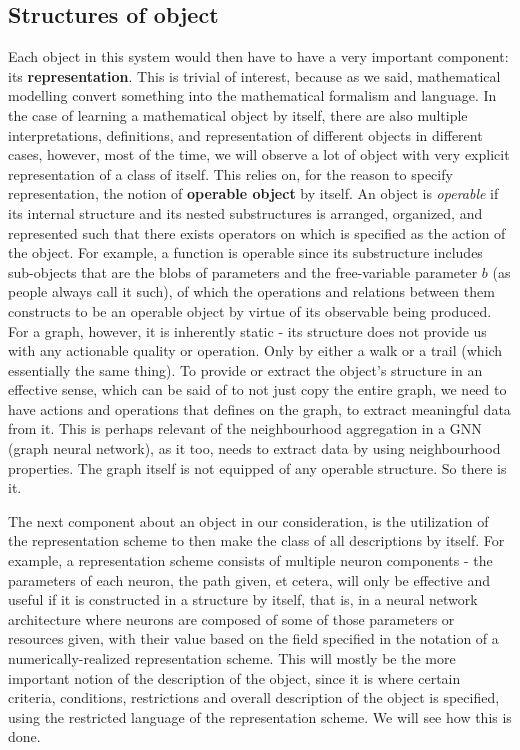 \documentclass{article}
\begin{document}
\subsection{Structures of object}


Each object in this system would then have to have a very important component: its \textbf{representation}. This is trivial of interest, because as we said, mathematical modelling convert something into the mathematical formalism and language. In the case of learning a mathematical object by itself, there are also multiple interpretations, definitions, and representation of different objects in different cases, however, most of the time, we will observe a lot of object with very explicit representation of a class of itself. This relies on, for the reason to specify representation, the notion of \textbf{operable object} by itself. An object is \textit{operable} if its internal structure and its nested substructures is arranged, organized, and represented such that there exists operators on which is specified as the action of the object. For example, a function is operable since its substructure includes sub-objects that are the blobs of parameters and the free-variable parameter $b$ (as people always call it such), of which the operations and relations between them constructs to be an operable object by virtue of its observable being produced. For a graph, however, it is inherently static - its structure does not provide us with any actionable quality or operation. Only by either a walk or a trail (which essentially the same thing). To provide or extract the object's structure in an effective sense, which can be said of to not just copy the entire graph, we need to have actions and operations that defines on the graph, to extract meaningful data from it. This is perhaps relevant of the neighbourhood aggregation in a GNN (graph neural network), as it too, needs to extract data by using neighbourhood properties. The graph itself is not equipped of any operable structure. So there is it. 

The next component about an object in our consideration, is the utilization of the representation scheme to then make the class of all descriptions by itself. For example, a representation scheme consists of multiple neuron components - the parameters of each neuron, the path given, et cetera, will only be effective and useful if it is constructed in a structure by itself, that is, in a neural network architecture where neurons are composed of some of those parameters or resources given, with their value based on the field specified in the notation of a numerically-realized representation scheme. This will mostly be the more important notion of the description of the object, since it is where certain criteria, conditions, restrictions and overall description of the object is specified, using the restricted language of the representation scheme. We will see how this is done. 
\end{document}
